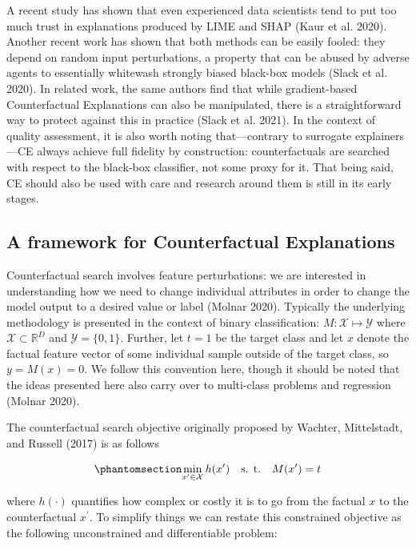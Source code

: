 \documentclass{juliacon}
\begin{document}
A recent study has shown that even experienced data scientists tend to
put too much trust in explanations produced by LIME and SHAP (Kaur et
al. 2020). Another recent work has shown that both methods can be easily
fooled: they depend on random input perturbations, a property that can
be abused by adverse agents to essentially whitewash strongly biased
black-box models (Slack et al. 2020). In related work, the same authors
find that while gradient-based Counterfactual Explanations can also be
manipulated, there is a straightforward way to protect against this in
practice (Slack et al. 2021). In the context of quality assessment, it
is also worth noting that---contrary to surrogate explainers---CE always
achieve full fidelity by construction: counterfactuals are searched with
respect to the black-box classifier, not some proxy for it. That being
said, CE should also be used with care and research around them is still
in its early stages.

\subsection{A framework for Counterfactual
Explanations}\label{sec-method}

Counterfactual search involves feature perturbations: we are interested
in understanding how we need to change individual attributes in order to
change the model output to a desired value or label (Molnar 2020).
Typically the underlying methodology is presented in the context of
binary classification: \(M: \mathcal{X} \mapsto \mathcal{Y}\) where
\(\mathcal{X}\subset\mathbb{R}^D\) and \(\mathcal{Y}=\{0,1\}\). Further,
let \(t=1\) be the target class and let \(x\) denote the factual feature
vector of some individual sample outside of the target class, so
\(y=M(x)=0\). We follow this convention here, though it should be noted
that the ideas presented here also carry over to multi-class problems
and regression (Molnar 2020).

The counterfactual search objective originally proposed by Wachter,
Mittelstadt, and Russell (2017) is as follows

\begin{equation}\phantomsection\label{eq-obj}{
\min_{x^\prime \in \mathcal{X}} h(x^\prime) \ \ \ \mbox{s. t.} \ \ \ M(x^\prime) = t
}\end{equation}

where \(h(\cdot)\) quantifies how complex or costly it is to go from the
factual \(x\) to the counterfactual \(x^\prime\). To simplify things we
can restate this constrained objective as the following unconstrained
and differentiable problem:
\end{document}
